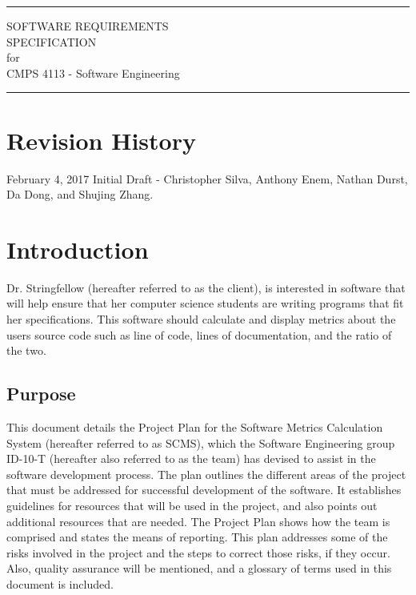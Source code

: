 \documentclass{scrreprt}
\author{Christopher Silva}
\date{}
\def\myversion{0.1 }
\begin{document}
	\begin{titlepage}
		\flushright
		\rule{16cm}{5pt}\vskip1cm
		\Huge{SOFTWARE REQUIREMENTS\\ SPECIFICATION}\\
		\vspace{2cm}
		for\\
		\vspace{2cm}
		CMPS 4113 - Software Engineering\\
		\vspace{2cm}
		\vfill
		\rule{16cm}{5pt}
	\end{titlepage}
	\tableofcontents
	\chapter*{Revision History}
	February 4, 2017 Initial Draft - Christopher Silva, Anthony Enem, Nathan Durst, Da Dong, and Shujing Zhang.
	\chapter{Introduction}
	Dr. Stringfellow (hereafter referred to as the client), is interested in software that will help ensure that her computer science students are writing programs that fit her specifications. This software should calculate and display metrics about the users source code such as line of code, lines of documentation, and the ratio of the two.
	\section{Purpose}
	This document details the Project Plan for the Software Metrics Calculation System (hereafter referred to as SCMS), which the Software Engineering group ID-10-T (hereafter also referred to as the team) has devised to assist in the software development process. The plan outlines the different areas of the project that must be addressed for successful development of the software. It establishes guidelines for resources that will be used in the project, and also points out additional resources that are needed. The Project Plan shows how the team is comprised and states the means of reporting. This plan addresses some of the risks involved in the project and the steps to correct those risks, if they occur. Also, quality assurance will be mentioned, and a glossary of terms used in this document is included.
\end{document}
